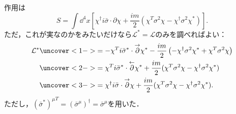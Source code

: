 \documentclass[pdflatex,unicode,ja=standard,12pt]{beamer}
\begin{document}
\begin{frame}
  
  \frametitle{\subsecname}

  作用は
  \begin{equation}
    S
    =
    \int\dd^4 x
    \left[  
      \chi^{\dag}i\bar{\sigma}\cdot\partial\chi
      +
      \frac{im}{2}
      (  
        \chi^{T}\sigma^2\chi
        -
        \chi^{\dag}\sigma^2\chi^{*}
      )
    \right]
    .
    \label{action}
  \end{equation}
  ただ，これが実なのかをみたいだけなら$\mathcal{L}^{*}=\mathcal{L}$のみを調べればよい：
  \begin{align}
    \mathcal{L}^{*}
    &
    \uncover<1->{
      =
      -
      \chi^{T}i\bar{\sigma}^{*}\cdot\overset{\rightarrow}{\partial}\chi^{*}
      -
      \frac{im}{2}
      \left(  
        -\chi^{\dag}\sigma^2\chi^{*}
        +\chi^{T}\sigma^2\chi
      \right)
    }
    \nonumber
    \\
    &
    \uncover<2->{
      =
      \chi^{T}i\bar{\sigma}^{*}\cdot\overset{\leftarrow}{\partial}\chi^{*}
      +
      \frac{im}{2}
      (  
        \chi^{T}\sigma^2\chi
        -
        \chi^{\dag}\sigma^2\chi^{*}
    )
    }
    \nonumber
    \\
    &\uncover<3->{
      =
      \chi^{\dag}i\bar{\sigma}\cdot\overset{\rightarrow}{\partial}\chi
      +
      \frac{im}{2}
      (  
        \chi^{T}\sigma^2\chi
        -
        \chi^{\dag}\sigma^2\chi^{*}
      )
      .
    }
  \end{align}
  ただし，${(\bar{\sigma}^*)^{\mu}}^{T}=(\bar{\sigma}^{\mu})^{\dag}=\bar{\sigma}^{\mu}$を用いた．

\end{frame}
\end{document}
